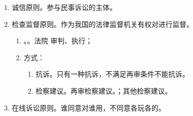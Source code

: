 \begin{enumerate}
\begin{kk}{约束性辩论原则}
        \end{kk}
  \item 诚信原则。参与民事诉讼的主体。
  \item 检查监督原则。作为我国的法律监督机关有权对进行监督。
        \begin{enumerate}
          \item {}。。法院 \yjt 审判、执行；
          \item 方式：
                \begin{enumerate}
                  \item 抗诉。只有一种抗诉，不满足再审条件不能抗诉。
                  \item 检察建议。再审检察建议。；其他检察建议。
                \end{enumerate}
        \end{enumerate}
  \item 在线诉讼原则。谁同意对谁用，不同意各玩各的。
\end{enumerate}

